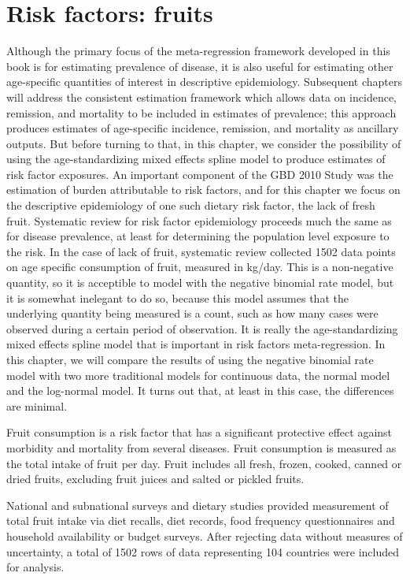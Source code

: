 \chapter{Risk factors: fruits}
\label{applications-log_normal}

Although the primary focus of the meta-regression framework developed
in this book is for estimating prevalence of disease, it is also
useful for estimating other age-specific quantities of interest in
descriptive epidemiology.  Subsequent chapters will address the
consistent estimation framework which allows data on incidence,
remission, and mortality to be included in estimates of prevalence;
this approach produces estimates of age-specific incidence, remission,
and mortality as ancillary outputs.  But before turning to that, in
this chapter, we consider the possibility of using the
age-standardizing mixed effects spline model to produce estimates of
risk factor exposures.  An important component of the GBD 2010 Study
was the estimation of burden attributable to risk factors, and for
this chapter we focus on the descriptive epidemiology of one such
dietary risk factor, the lack of fresh fruit.  Systematic review for
risk factor epidemiology proceeds much the same as for disease
prevalence, at least for determining the population level exposure to
the risk.  In the case of lack of fruit, systematic review collected
1502 data points on age specific consumption of fruit, measured in
kg/day.  This is a non-negative quantity, so it is acceptible to model
with the negative binomial rate model, but it is somewhat inelegant to
do so, because this model assumes that the underlying quantity being
measured is a count, such as how many cases were observed during a
certain period of observation.  It is really the age-standardizing
mixed effects spline model that is important in risk factors
meta-regression.  In this chapter, we will compare the results of
using the negative binomial rate model with two more traditional
models for continuous data, the normal model and the log-normal model.
It turns out that, at least in this case, the differences are minimal.

Fruit consumption is a risk factor that has a significant protective
effect against morbidity and mortality from several diseases.  Fruit
consumption is measured as the total intake of fruit per day.  Fruit
includes all fresh, frozen, cooked, canned or dried fruits, excluding
fruit juices and salted or pickled fruits. \cite{he_increased_2007,
  boeing_intake_2006}

National and subnational surveys and dietary studies provided
measurement of total fruit intake via diet recalls, diet records, food
frequency questionnaires and household availability or budget surveys.
After rejecting data without measures of uncertainty, a total of 1502
rows of data representing 104 countries were included for analysis.

